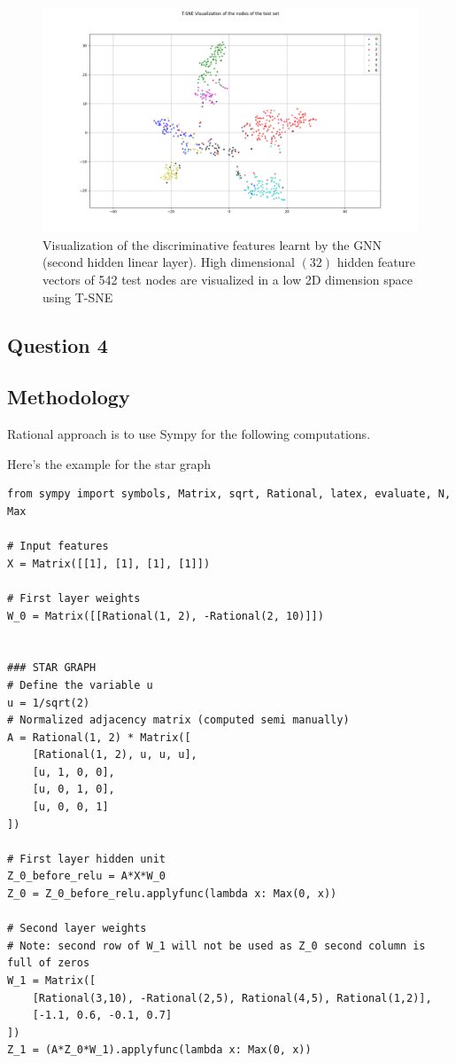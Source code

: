 \documentclass[a4paper]{article}
\begin{document}
\begin{figure}[ht]
    \centering
    \includegraphics[width=1.\textwidth]{figures/tSNE_Cora.png}
    \caption{Visualization of the discriminative features learnt by the GNN (second hidden linear layer). 
    High dimensional $(32)$ hidden feature vectors of 542 test nodes are visualized in a low 2D dimension space using T-SNE}
    \label{fig:tsne_cora}
\end{figure}
\break
\subsection*{Question 4}
\subsection*{Methodology}

Rational approach is to use Sympy for the following computations.

Here's the example for the star graph

\begin{verbatim}
from sympy import symbols, Matrix, sqrt, Rational, latex, evaluate, N, Max

# Input features
X = Matrix([[1], [1], [1], [1]])

# First layer weights
W_0 = Matrix([[Rational(1, 2), -Rational(2, 10)]])


### STAR GRAPH
# Define the variable u
u = 1/sqrt(2)
# Normalized adjacency matrix (computed semi manually)
A = Rational(1, 2) * Matrix([
    [Rational(1, 2), u, u, u],
    [u, 1, 0, 0],
    [u, 0, 1, 0],
    [u, 0, 0, 1]
])

# First layer hidden unit
Z_0_before_relu = A*X*W_0
Z_0 = Z_0_before_relu.applyfunc(lambda x: Max(0, x))

# Second layer weights 
# Note: second row of W_1 will not be used as Z_0 second column is full of zeros
W_1 = Matrix([
    [Rational(3,10), -Rational(2,5), Rational(4,5), Rational(1,2)],
    [-1.1, 0.6, -0.1, 0.7]
])
Z_1 = (A*Z_0*W_1).applyfunc(lambda x: Max(0, x))
\end{verbatim}
\end{document}
